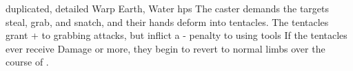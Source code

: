   {duplicated, detailed}%
  {Warp}%
  {Earth, Water}%
  {\glspl{hp}}%
  {The caster demands the targets steal, grab, and snatch, and their hands deform into  tentacles.
  The tentacles grant + to grabbing attacks, but inflict a - penalty to using tools}%
  {
  If the tentacles ever receive  Damage or more, they begin to revert to normal limbs over the course of .}
